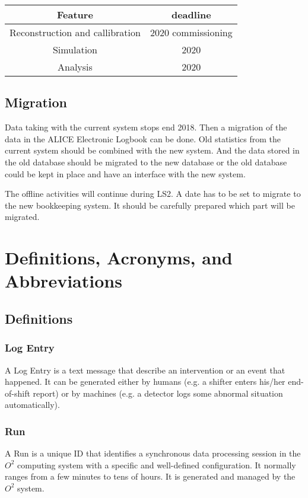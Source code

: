 \begin{tabular}{cc}
\hline
Feature & deadline\\
\hline
\hline
 Reconstruction and callibration  & 2020 commissioning \\
 \hline
Simulation   & 2020\\
\hline
Analysis & 2020\\
\hline
\end{tabular}

\subsection{Migration}
Data taking with the current system stops end 2018. Then a migration of the data in the ALICE Electronic Logbook can be done. Old statistics from the current system should be combined with the new system. And the data stored in the old database should be migrated to the new database or the old database could be kept in place and have an interface with the new system. 

The offline activities will continue during LS2. A date has to be set to migrate to the new bookkeeping system. It should be carefully prepared which part will be migrated.

\section{Definitions, Acronyms, and Abbreviations}

\subsection{Definitions}
\subsubsection{Log Entry}
A Log Entry is a text message that describe an intervention or an event that happened. It can be generated either by humans (e.g. a shifter enters his/her end-of-shift report) or by machines (e.g. a detector logs some abnormal situation automatically). 

\subsubsection{Run}
A Run is a unique ID that identifies a synchronous data processing session in the $O^2$ computing system with a specific and well-defined configuration. It normally ranges from a few minutes to tens of hours. It is generated and managed by the $O^2$ system. 

